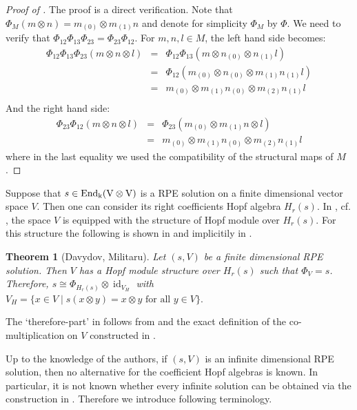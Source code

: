 \documentclass[a4paper,10pt]{amsart}
\newtheorem{theorem}[lemma]{Theorem}
\theoremstyle{definition}
\theoremstyle{remark}
\newcommand\End{\rm End}
\DeclareMathOperator{\id}{id}
\newcommand\ot{\otimes}
\begin{document}
\begin{proof}[Proof of ]
The proof is a direct verification. Note that $\Phi_M(m\ot n) = m_{(0)} \ot m_{(1)}n$ and denote for simplicity $\Phi_M$ by $\Phi$. We need to verify that $\Phi_{12}\Phi_{13}\Phi_{23} = \Phi_{23}\Phi_{12}.$ For $m,n,l \in M$, the left hand side becomes:
$$\begin{array}{lcl}
  \Phi_{12}\Phi_{13}\Phi_{23}(m \ot n \ot l)   & =  & \Phi_{12}\Phi_{13}(m \ot n_{(0)} \ot n_{(1)}l )\\
     & =& \Phi_{12}(m_{(0)} \ot n_{(0)} \ot m_{(1)}n_{(1)}l)\\
     & =& m_{(0)} \ot m_{(1)}n_{(0)} \ot m_{(2)} n_{(1)}l \\
\end{array}$$
And the right hand side:
$$\begin{array}{lcl}
   \Phi_{23}\Phi_{12}(m \ot n \ot l)  & = & \Phi_{23}(m_{(0)} \ot m_{(1)}n \ot l)\\
     & =& m_{(0)} \ot m_{(1)}n_{(0)} \ot m_{(2)}n_{(1)}l
\end{array}$$
where in the last equality we used the compatibility of the structural maps of $M$.
\end{proof}

Suppose that $s \in \End_k(V\ot V)$ is a RPE solution on a finite dimensional vector space $V$. Then one can consider its right coefficients Hopf algebra $H_{r}(s)$. In \cite[Section 5]{Dav}, cf. , the space $V$ is equipped with the structure of Hopf module over $H_{r}(s)$. For this structure the following is shown in \cite[Theorem 5.7]{Dav} and implicitily in \cite[Theorem 2.1]{Mi04}.

\begin{theorem}[Davydov, Militaru]\label{reconstruction fd RPE}
    Let $(s,V)$ be a finite dimensional RPE solution. Then $V$ has a Hopf module structure over $H_{r}(s)$ such that $\Phi_V = s$. Therefore, $s \cong \Phi_{H_r(s)} \ot \id_{V_H}$ with $V_H = \{  x \in V \mid s(x \ot y) = x \ot y \text{ for all } y \in V\}.$
\end{theorem}

The `therefore-part' in  follows from  and the exact definition of the co-multiplication on $V$ constructed in \cite[Section 5]{Dav}. 

Up to the knowledge of the authors, if $(s,V)$ is an infinite dimensional RPE solution, then no alternative for the coefficient Hopf algebras is known. In particular, it is not known whether every infinite solution can be obtained via the construction in . Therefore we introduce following terminology.
\end{document}

